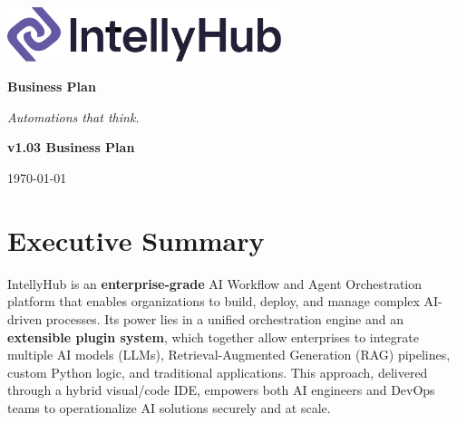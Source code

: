\documentclass[11pt, a4paper, oneside]{article}
\begin{document}
\thispagestyle{empty} 
\begin{titlepage}
    \centering
    \vspace*{1cm}
    
    \includegraphics[width=0.6\textwidth]{IntellyHub_Logo_Colored.png}
    
    \vspace{2.5cm}
    
    {\Huge\bfseries\color{PrimaryColor}Business Plan}
    
    \vspace{1.5cm}
    
    {\Large\itshape\lightfont Automations that think.}
    
    \vfill %
    
    {\large\bfseries\color{PrimaryColor}v1.03 \color{SecondaryColor}Business Plan}
    
    \vspace{0.5cm}
    
    {\large \today}
    
\end{titlepage}

\tableofcontents
\newpage

\section{Executive Summary}

IntellyHub is an \textbf{enterprise-grade} AI Workflow and Agent Orchestration platform that enables organizations to build, deploy, and manage complex AI-driven processes. Its power lies in a unified orchestration engine and an \textbf{extensible plugin system}, which together allow enterprises to integrate multiple AI models (LLMs), Retrieval-Augmented Generation (RAG) pipelines, custom Python logic, and traditional applications. This approach, delivered through a hybrid visual/code IDE, empowers both AI engineers and DevOps teams to operationalize AI solutions securely and at scale.
\end{document}
